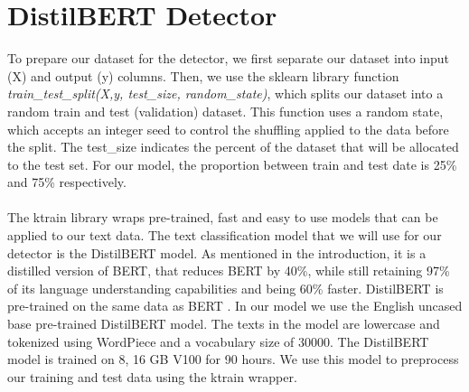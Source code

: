 \section{DistilBERT Detector}
To prepare our dataset for the detector, we first separate our dataset into input (X) and output (y) columns.  Then, we use the sklearn library function \textit{train\_test\_split(X,y, test\_size, random\_state)}, which splits our dataset into a random train and test (validation) dataset. This function uses a random state, which accepts an integer seed to control the shuffling applied to the data before the split. The test\_size indicates the percent of the dataset that will be allocated to the test set. For our model, the proportion between train and test date is 25\% and 75\% respectively.\\\\
The ktrain library wraps pre-trained, fast and easy to use models that can be applied to our text data. The text classification model that we will use for our detector is the DistilBERT \cite{Sanh2019DistilBERTAD} model. As mentioned in the introduction, it is a distilled version of BERT, that reduces BERT by 40\%, while still retaining 97\% of its language understanding capabilities and being 60\% faster. DistilBERT is pre-trained on the same data as BERT \cite{ColBERT}. In our model we use the English uncased base pre-trained DistilBERT model. The texts in the model are lowercase and tokenized using WordPiece \cite{WordPiece} and a vocabulary size of $30000$. The DistilBERT model is trained on 8, 16 GB V100 for 90 hours. We use this model to preprocess our training and test data using the ktrain wrapper. 


